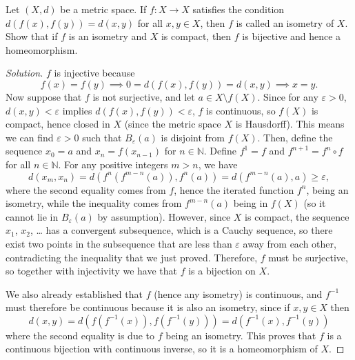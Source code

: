 \documentclass[10pt]{article}
\providecommand{\eps}{\varepsilon}
\providecommand{\NN}{\mathbb N}
\providecommand{\inv}{^{-1}}
\newenvironment{soln}{\begin{proof}[Solution]}{\end{proof}}
\begin{document}
\begin{problem}
    [Munkres 28.6]
    Let $(X,d)$ be a metric space. If $f\colon X\to X$ satisfies the condition
    $d(f(x), f(y)) = d(x,y)$ for all $x,y\in X$, then
    $f$ is called an isometry of $X$. Show that if $f$ is an isometry
    and $X$ is compact, then $f$ is bijective and hence a homeomorphism.
\end{problem}

\begin{soln}
    $f$ is injective because
    \begin{equation*}
        f(x) = f(y)\implies 0 = d(f(x),f(y)) = d(x,y) \implies x = y.
    \end{equation*}
    Now suppose that $f$ is not surjective, and let $a\in X\setminus f(X)$.
    Since for any $\eps>0$, $d(x,y) < \eps$ implies $d(f(x),f(y)) < \eps$,
    $f$ is continuous, so $f(X)$ is compact, hence closed in $X$
    (since the metric space $X$ is Hausdorff). This means
    we can find $\eps>0$ such that $B_\eps(a)$ is disjoint from $f(X)$.
    Then, define the sequence $x_0 = a$ and $x_n = f(x_{n-1})$ for $n\in\NN$.
    Define $f^1 = f$ and $f^{n+1} = f^n\circ f$ for all $n\in\NN$.
    For any positive integers $m > n$, we have
    \begin{equation*}
	d(x_m, x_n) = d(f^{n}(f^{m-n}(a)), f^n(a))
	= d(f^{m-n}(a), a) \ge \eps,
    \end{equation*}
    where the second equality comes from $f$, hence the iterated function $f^n$,
    being an isometry, while the inequality comes from $f^{m-n}(a)$
    being in $f(X)$ (so it cannot lie in $B_\eps(a)$ by assumption).
    However, since $X$ is compact, the sequence $x_1$, $x_2$, \dots
    has a convergent subsequence, which is a Cauchy sequence,
    so there exist two points in the subsequence
    that are less than $\eps$ away from each other,
    contradicting the inequality that we just proved.
    Therefore, $f$ must be surjective, so together with injectivity
    we have that $f$ is a bijection on $X$.

    We also already established that $f$ (hence any isometry) is continuous,
    and $f\inv$ must therefore be continuous
    because it is also an isometry, since if $x,y\in X$ then
    \begin{equation*}
        d(x,y) = d(f(f\inv(x)), f(f\inv(y))) = d(f\inv(x), f\inv(y))
    \end{equation*}
    where the second equality is due to $f$ being an isometry.
    This proves that $f$ is a continuous bijection with continuous inverse,
    so it is a homeomorphism of $X$.
\end{soln}
\end{document}
